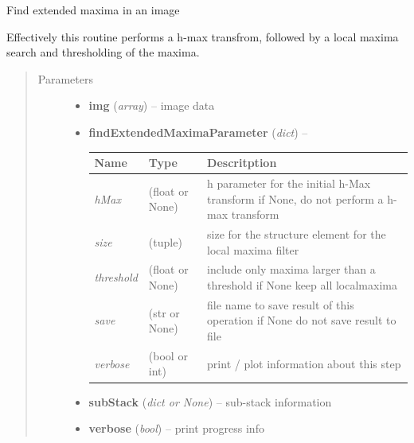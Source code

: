 \documentclass[letterpaper,10pt,english]{sphinxmanual}
\begin{document}
\begin{fulllineitems}
\label{api/ClearMap.ImageProcessing:ClearMap.ImageProcessing.MaximaDetection.findExtendedMaxima}
Find extended maxima in an image

Effectively this routine performs a h-max transfrom, followed by a local maxima search and
thresholding of the maxima.
\begin{quote}\begin{description}
\item[{Parameters}] \leavevmode\begin{itemize}
\item {} 
\textbf{img} (\emph{array}) --
image data

\item {} 
\textbf{findExtendedMaximaParameter} (\emph{dict}) --

\begin{tabulary}{\linewidth}{|L|L|L|}
\hline
\textsf{\relax 
Name
} & \textsf{\relax 
Type
} & \textsf{\relax 
Descritption
}\\
\hline
\emph{hMax}
 & 
(float or None)
 & 
h parameter for the initial h-Max transform
if None, do not perform a h-max transform
\\
\hline
\emph{size}
 & 
(tuple)
 & 
size for the structure element for the local maxima filter
\\
\hline
\emph{threshold}
 & 
(float or None)
 & 
include only maxima larger than a threshold
if None keep all localmaxima
\\
\hline
\emph{save}
 & 
(str or None)
 & 
file name to save result of this operation
if None do not save result to file
\\
\hline
\emph{verbose}
 & 
(bool or int)
 & 
print / plot information about this step
\\
\hline\end{tabulary}


\item {} 
\textbf{subStack} (\emph{dict or None}) --
sub-stack information

\item {} 
\textbf{verbose} (\emph{bool}) --
print progress info


\end{itemize}
\end{description}
\end{quote}
\end{fulllineitems}
\end{document}
